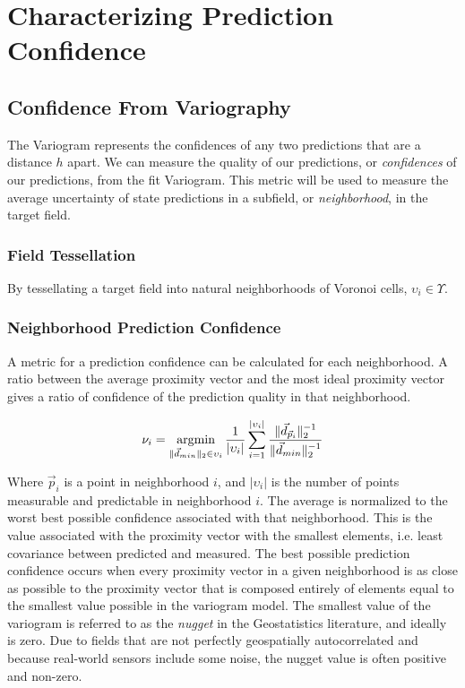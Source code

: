 \chapter{Characterizing Prediction Confidence}
\section{Confidence From Variography}
The Variogram represents the confidences of any two predictions that are a distance $h$ apart. We can measure the quality of our predictions, or \textit{confidences} of our predictions, from the fit Variogram. This metric will be used to measure the average uncertainty of state predictions in a subfield, or \textit{neighborhood}, in the target field.

\subsection{Field Tessellation}
By tessellating a target field into natural neighborhoods of Voronoi cells, $\upsilon_i \in \Upsilon$. %

\subsection{Neighborhood Prediction Confidence}
A metric for a prediction confidence can be calculated for each neighborhood. A ratio between the average proximity vector and the most ideal proximity vector gives a ratio of confidence of the prediction quality in that neighborhood. %

\begin{equation}
\label{equ:neigh_conf}
\nu_i = \operatornamewithlimits{argmin}_{\| \vec{d}_{min} \|_2 \in \upsilon_i} \frac{1}{|\upsilon_i|} \large\sum_{i = 1}^{|\upsilon_i|} \frac{\| \vec{d}_{\vec{p}_i} \|_{2}^{-1}} {\| \vec{d}_{min} \|_2^{-1}}
\end{equation}

Where $\vec{p}_i$ is a point in neighborhood $i$, and $|\upsilon_i|$ is the number of points measurable and predictable in neighborhood $i$. The average is normalized to the worst best possible confidence associated with that neighborhood. This is the value associated with the proximity vector with the smallest elements, i.e. least covariance between predicted and measured. %
The best possible prediction confidence occurs when every proximity vector in a given neighborhood is as close as possible to the proximity vector that is composed entirely of elements equal to the smallest value possible in the variogram model. The smallest value of the variogram is referred to as the \textit{nugget} in the Geostatistics literature, and ideally is zero. Due to fields that are not perfectly geospatially autocorrelated and because real-world sensors include some noise, the nugget value is often positive and non-zero. 

